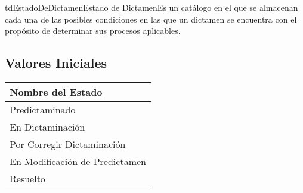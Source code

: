 \begin{TipoDeDato}{tdEstadoDeDictamen}{Estado de Dictamen}{Es un catálogo en el que se almacenan cada una de las posibles condiciones en las que un dictamen se encuentra con el propósito de determinar sus procesos aplicables.}
	\begin{tdAtributos}
	\end{tdAtributos}
	\subsection{Valores Iniciales}
	
	\begin{longtable}{|p{}|}
		\rowcolor{colorPrincipal}
		\bf \color{white} Nombre del Estado\\
		\hline
		Predictaminado \\
		\hline
		En Dictaminación \\
		\hline
		Por Corregir Dictaminación\\
		\hline
		En Modificación de Predictamen\\
		\hline
		Resuelto\\
		\hline
	\end{longtable}
\end{TipoDeDato}

